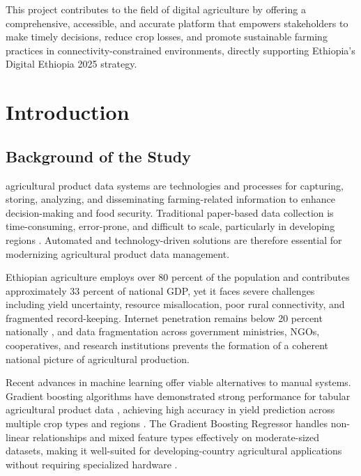 \documentclass[12pt,a4paper,oneside]{report}
\begin{document}
This project contributes to the field of digital agriculture by offering a comprehensive, accessible, and accurate platform that empowers stakeholders to make timely decisions, reduce crop losses, and promote sustainable farming practices in connectivity-constrained environments, directly supporting Ethiopia's Digital Ethiopia 2025 strategy.

\clearpage
{}
\chapter{Introduction}

\section{Background of the Study}
agricultural product data systems are technologies and processes for capturing, storing, analyzing, and disseminating farming-related information to enhance decision-making and food security. Traditional paper-based data collection is time-consuming, error-prone, and difficult to scale, particularly in developing regions \cite{vanklinken2022}. Automated and technology-driven solutions are therefore essential for modernizing agricultural product data management.

Ethiopian agriculture employs over 80 percent of the population and contributes approximately 33 percent of national GDP, yet it faces severe challenges including yield uncertainty, resource misallocation, poor rural connectivity, and fragmented record-keeping. Internet penetration remains below 20 percent nationally \cite{worldbank2022}, and data fragmentation across government ministries, NGOs, cooperatives, and research institutions prevents the formation of a coherent national picture of agricultural production.

Recent advances in machine learning offer viable alternatives to manual systems. Gradient boosting algorithms have demonstrated strong performance for tabular agricultural product data , achieving high accuracy in yield prediction across multiple crop types and regions \cite{patel2020}. The Gradient Boosting Regressor handles non-linear relationships and mixed feature types effectively on moderate-sized datasets, making it well-suited for developing-country agricultural applications without requiring specialized hardware \cite{scikit2024}.
\end{document}
